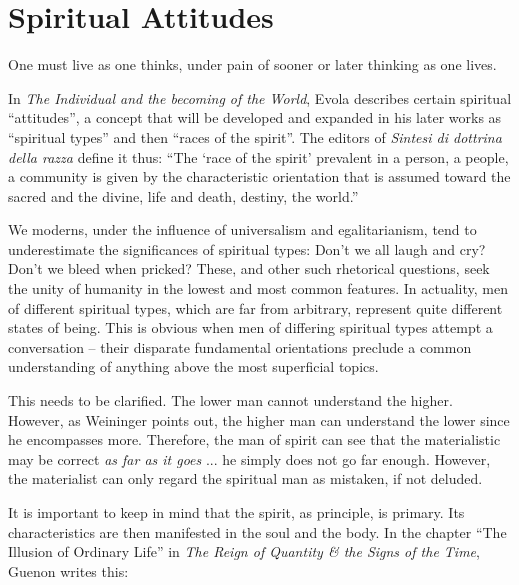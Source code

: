 \section{Spiritual Attitudes}

\begin{quotex}
One must live as one thinks, under pain of sooner or later thinking as one lives.
\end{quotex}


In \emph{The Individual and the becoming of the World}, Evola describes certain spiritual ``attitudes'', a concept that will be developed and expanded in his later works as ``spiritual types'' and then ``races of the spirit''. The editors of \emph{Sintesi di dottrina della razza} define it thus: ``The `race of the spirit' prevalent in a person, a people, a community is given by the characteristic orientation that is assumed toward the sacred and the divine, life and death, destiny, the world.''

We moderns, under the influence of universalism and egalitarianism, tend to underestimate the significances of spiritual types: Don't we all laugh and cry? Don't we bleed when pricked? These, and other such rhetorical questions, seek the unity of humanity in the lowest and most common features. In actuality, men of different spiritual types, which are far from arbitrary, represent quite different states of being. This is obvious when men of differing spiritual types attempt a conversation -- their disparate fundamental orientations preclude a common understanding of anything above the most superficial topics.

This needs to be clarified. The lower man cannot understand the higher. However, as Weininger points out, the higher man can understand the lower since he encompasses more. Therefore, the man of spirit can see that the materialistic may be correct \emph{as far as it goes} ... he simply does not go far enough. However, the materialist can only regard the spiritual man as mistaken, if not deluded.

It is important to keep in mind that the spirit, as principle, is primary. Its characteristics are then manifested in the soul and the body. In the chapter ``The Illusion of Ordinary Life'' in \emph{The Reign of Quantity \& the Signs of the Time}, Guenon writes this:

